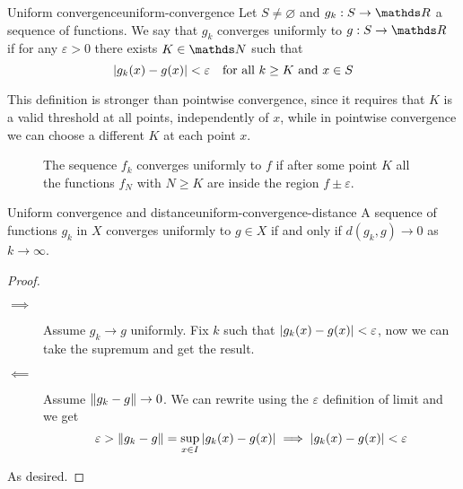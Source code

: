 \documentclass[12pt]{extarticle}
\begin{document}
\begin{definition}{Uniform convergence}{uniform-convergence}
    Let $S \neq \varnothing$ and $g_k : S \to \R$ a sequence of functions.
    We say that $g_k$ converges uniformly to $g: S \to \R$ if for any $\varepsilon > 0$ there exists $K \in \N$ such that
    \begin{equation}
        \abs{g_k(x) - g(x)} < \varepsilon \quad \text{for all } k \geq K \text{ and } x \in S
    \end{equation}
\end{definition}
This definition is stronger than pointwise convergence, since it requires that $K$ is a valid threshold at all points,
independently of $x$, while in pointwise convergence we can choose a different $K$ at each point $x$.

\begin{figure}[H]
    \centering
    
    \caption{The sequence $f_k$ converges uniformly to $f$ if after some point $K$ all the functions $f_N$ with $N \geq K$ are inside the region $f\pm \varepsilon$.}
\end{figure}

\begin{proposition}{Uniform convergence and distance}{uniform-convergence-distance}
    A sequence of functions $g_k$ in $X$ converges uniformly to $g \in X$ if and only if
    $d(g_k, g) \to 0$ as $k \to \infty$.
\end{proposition}
\begin{proof}
    \skiplineafterproof
    \begin{description}
        \item[$\implies$]
              Assume $g_k \to g$ uniformly.
              Fix $k$ such that $\abs{g_k(x) -g(x)} < \varepsilon$, now we can take the supremum and get the result.
        \item[$\impliedby$]
              Assume $\norm{g_k - g} \to 0$.
              We can rewrite using the $\varepsilon$ definition of limit and we get
              \begin{equation}
                  \varepsilon > \norm{g_k - g} = \sup_{x \in I}\abs{g_k(x)-g(x)} \implies \abs{g_k(x) - g(x)} < \varepsilon
              \end{equation}
    \end{description}
    As desired.
\end{proof}
\end{document}
